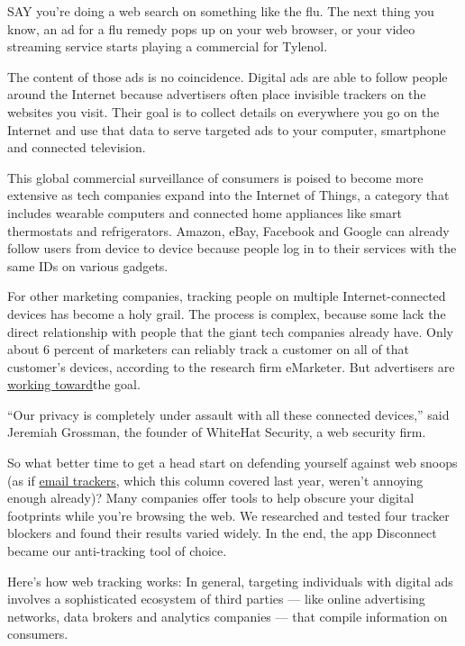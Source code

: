 SAY you're doing a web search on something like the flu. The next thing
you know, an ad for a flu remedy pops up on your web browser, or your
video streaming service starts playing a commercial for Tylenol.

The content of those ads is no coincidence. Digital ads are able to
follow people around the Internet because advertisers often place
invisible trackers on the websites you visit. Their goal is to collect
details on everywhere you go on the Internet and use that data to serve
targeted ads to your computer, smartphone and connected television.

This global commercial surveillance of consumers is poised to become
more extensive as tech companies expand into the Internet of Things, a
category that includes wearable computers and connected home appliances
like smart thermostats and refrigerators. Amazon, eBay, Facebook and
Google can already follow users from device to device because people log
in to their services with the same IDs on various gadgets.

For other marketing companies, tracking people on multiple
Internet-connected devices has become a holy grail. The process is
complex, because some lack the direct relationship with people that the
giant tech companies already have. Only about 6 percent of marketers can
reliably track a customer on all of that customer's devices, according
to the research firm eMarketer. But advertisers are
\href{http://www.emarketer.com/Webinar/Cross-Device-TargetingWhat-Watch-2016/4000126}{working
toward}the goal.

``Our privacy is completely under assault with all these connected
devices,'' said Jeremiah Grossman, the founder of WhiteHat Security, a
web security firm.

So what better time to get a head start on defending yourself against
web snoops (as if
\href{http://www.nytimes3xbfgragh.onion/2015/11/19/technology/personaltech/foiling-electronic-snoops-in-email.html}{email
trackers}, which this column covered last year, weren't annoying enough
already)? Many companies offer tools to help obscure your digital
footprints while you're browsing the web. We researched and tested four
tracker blockers and found their results varied widely. In the end, the
app Disconnect became our anti-tracking tool of choice.

Here's how web tracking works: In general, targeting individuals with
digital ads involves a sophisticated ecosystem of third parties --- like
online advertising networks, data brokers and analytics companies ---
that compile information on consumers.

